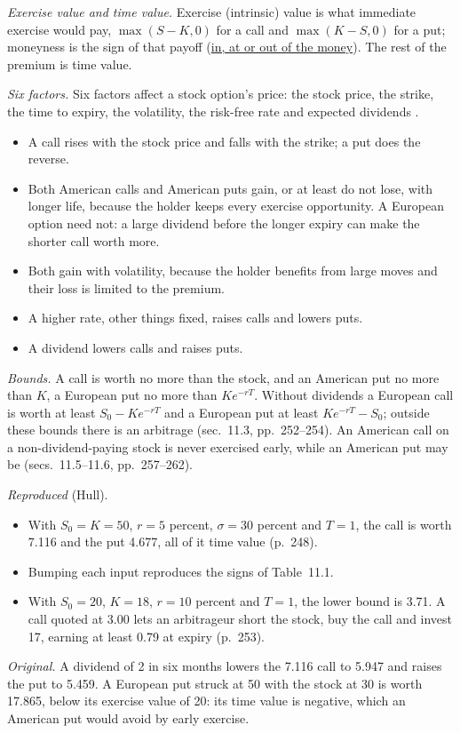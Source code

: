 \begin{qfdefinition}\label{def:option-value-drivers}
 \emph{Exercise value and time value.} Exercise (intrinsic) value is what immediate exercise would pay, $\max(S-K,0)$ for a call and $\max(K-S,0)$ for a put; moneyness is the sign of that payoff (\hyperref[meth:option-payoff-profit]{in, at or out of the money}). The rest of the premium is time value.

\emph{Six factors.} Six factors affect a stock option's price: the stock price, the strike, the time to expiry, the volatility, the risk-free rate and expected dividends \citep[chap.~11, sec.~11.1, pp.~247--251, Table~11.1]{s7-hulloptions}.
\begin{itemize}
\item A call rises with the stock price and falls with the strike; a put does the reverse.
\item Both American calls and American puts gain, or at least do not lose, with longer life, because the holder keeps every exercise opportunity. A European option need not: a large dividend before the longer expiry can make the shorter call worth more.
\item Both gain with volatility, because the holder benefits from large moves and their loss is limited to the premium.
\item A higher rate, other things fixed, raises calls and lowers puts.
\item A dividend lowers calls and raises puts.
\end{itemize}

\emph{Bounds.} A call is worth no more than the stock, and an American put no more than $K$, a European put no more than $Ke^{-rT}$. Without dividends a European call is worth at least $S_0-Ke^{-rT}$ and a European put at least $Ke^{-rT}-S_0$; outside these bounds there is an arbitrage (sec.~11.3, pp.~252--254). An American call on a non-dividend-paying stock is never exercised early, while an American put may be (secs.~11.5--11.6, pp.~257--262).

 \emph{Reproduced} (Hull).
\begin{itemize}
\item With $S_0=K=50$, $r=5$ percent, $\sigma=30$ percent and $T=1$, the call is worth 7.116 and the put 4.677, all of it time value (p.~248).
\item Bumping each input reproduces the signs of Table~11.1.
\item With $S_0=20$, $K=18$, $r=10$ percent and $T=1$, the lower bound is 3.71. A call quoted at 3.00 lets an arbitrageur short the stock, buy the call and invest 17, earning at least 0.79 at expiry (p.~253).
\end{itemize}
\emph{Original.} A dividend of 2 in six months lowers the 7.116 call to 5.947 and raises the put to 5.459. A European put struck at 50 with the stock at 30 is worth 17.865, below its exercise value of 20: its time value is negative, which an American put would avoid by early exercise.


\end{qfdefinition}
